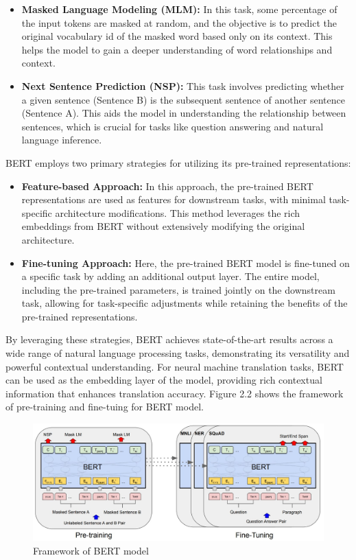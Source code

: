 \documentclass[PhD]{PHlab-thesis}
\begin{document}
\begin{itemize}
    \item \textbf{Masked Language Modeling (MLM):} In this task, some percentage of the input tokens are masked at random, and the objective is to predict the original vocabulary id of the masked word based only on its context. This helps the model to gain a deeper understanding of word relationships and context.
    \item \textbf{Next Sentence Prediction (NSP):} This task involves predicting whether a given sentence (Sentence B) is the subsequent sentence of another sentence (Sentence A). This aids the model in understanding the relationship between sentences, which is crucial for tasks like question answering and natural language inference.
\end{itemize}

BERT employs two primary strategies for utilizing its pre-trained representations:
\begin{itemize}
    \item \textbf{Feature-based Approach:} In this approach, the pre-trained BERT representations are used as features for downstream tasks, with minimal task-specific architecture modifications. This method leverages the rich embeddings from BERT without extensively modifying the original architecture.
    \item \textbf{Fine-tuning Approach:} Here, the pre-trained BERT model is fine-tuned on a specific task by adding an additional output layer. The entire model, including the pre-trained parameters, is trained jointly on the downstream task, allowing for task-specific adjustments while retaining the benefits of the pre-trained representations.
\end{itemize}

By leveraging these strategies, BERT achieves state-of-the-art results across a wide range of natural language processing tasks, demonstrating its versatility and powerful contextual understanding. For neural machine translation tasks, BERT can be used as the embedding layer of the model, providing rich contextual information that enhances translation accuracy. Figure 2.2 shows the framework of pre-training and fine-tuing for BERT model.

\begin{figure}[h!]
  \centering
  \includegraphics[width=\linewidth]{fig_3_bert.jpg}
  \captionsetup{type=figure}
  \caption{Framework of BERT model}
  \label{fig:framwork_bert}
\end{figure}
\end{document}
